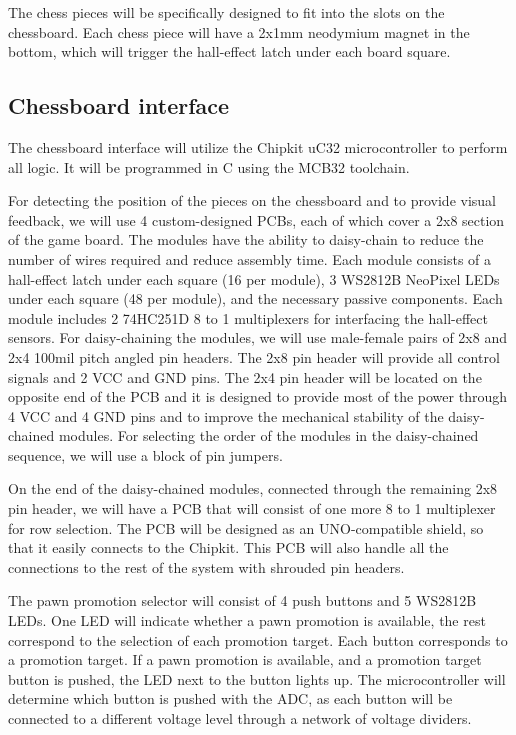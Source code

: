 \documentclass{article}
\begin{document}
The chess pieces will be specifically designed to fit into the slots on the chessboard. Each chess piece will have a 2x1mm neodymium magnet in the bottom, which will trigger the hall-effect latch under each board square.

\subsection*{Chessboard interface}

The chessboard interface will utilize the Chipkit uC32 microcontroller to perform all logic. It will be programmed in C using the MCB32 toolchain.

For detecting the position of the pieces on the chessboard and to provide visual feedback, we will use 4 custom-designed PCBs, each of which cover a 2x8 section of the game board. The modules have the ability to daisy-chain to reduce the number of wires required and reduce assembly time. Each module consists of a hall-effect latch under each square (16 per module), 3 WS2812B NeoPixel LEDs under each square (48 per module), and the necessary passive components. Each module includes 2 74HC251D 8 to 1 multiplexers for interfacing the hall-effect sensors. For daisy-chaining the modules, we will use male-female pairs of 2x8 and 2x4 100mil pitch angled pin headers. The 2x8 pin header will provide all control signals and 2 VCC and GND pins. The 2x4 pin header will be located on the opposite end of the PCB and it is designed to provide most of the power through 4 VCC and 4 GND pins and to improve the mechanical stability of the daisy-chained modules. For selecting the order of the modules in the daisy-chained sequence, we will use a block of pin jumpers.

On the end of the daisy-chained modules, connected through the remaining 2x8 pin header, we will have a PCB that will consist of one more 8 to 1 multiplexer for row selection. The PCB will be designed as an UNO-compatible shield, so that it easily connects to the Chipkit. This PCB will also handle all the connections to the rest of the system  with shrouded pin headers.

The pawn promotion selector will consist of 4 push buttons and 5 WS2812B LEDs. One LED will indicate whether a pawn promotion is available, the rest correspond to the selection of each promotion target. Each button corresponds to a promotion target. If a pawn promotion is available, and a promotion target button is pushed, the LED next to the button lights up. The microcontroller will determine which button is pushed with the ADC, as each button will be connected to a different voltage level through a network of voltage dividers.
\end{document}

